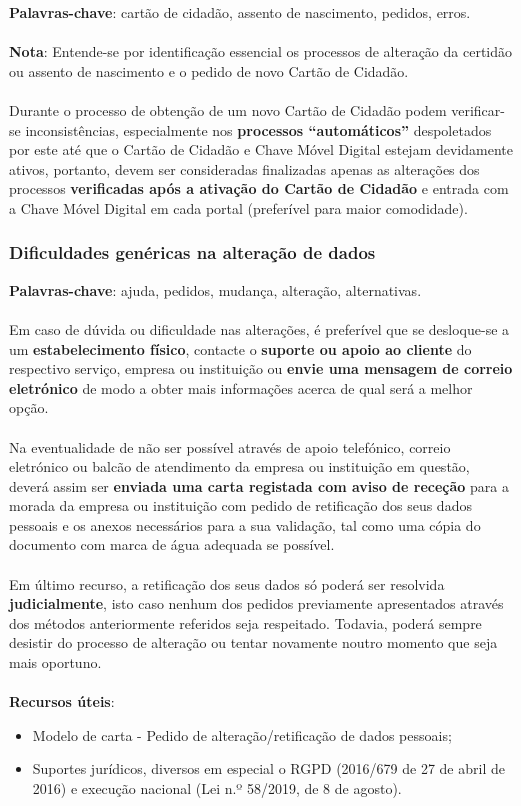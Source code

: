 \textbf{Palavras-chave}: cartão de cidadão, assento de nascimento, pedidos, erros. \\
\\
\textbf{Nota}: Entende-se por identificação essencial os processos de
alteração da certidão ou assento de nascimento e o pedido de novo Cartão
de Cidadão. \\
\\
Durante o processo de obtenção de um novo Cartão de Cidadão podem
verificar-se inconsistências, especialmente nos \textbf{processos
	``automáticos''} despoletados por este até que o Cartão de Cidadão e
Chave Móvel Digital estejam devidamente ativos, portanto, devem ser
consideradas finalizadas apenas as alterações dos processos
\textbf{verificadas após a ativação do Cartão de Cidadão} e entrada com
a Chave Móvel Digital em cada portal (preferível para maior comodidade).

\subsubsection{Dificuldades genéricas na alteração de dados}

\textbf{Palavras-chave}: ajuda, pedidos, mudança, alteração, alternativas. \\
\\
Em caso de dúvida ou dificuldade nas alterações, é preferível que se
desloque-se a um \textbf{estabelecimento físico}, contacte o
\textbf{suporte ou apoio ao cliente} do respectivo serviço, empresa ou
instituição ou \textbf{envie uma mensagem de correio eletrónico} de modo
a obter mais informações acerca de qual será a melhor opção.\\
\\
Na eventualidade de não ser possível através de apoio telefónico,
correio eletrónico ou balcão de atendimento da empresa ou instituição em
questão, deverá assim ser \textbf{enviada uma carta registada com aviso
	de receção} para a morada da empresa ou instituição com pedido de
retificação dos seus dados pessoais e os anexos necessários para a sua
validação, tal como uma cópia do documento com marca de água adequada se
possível.\\
\\
Em último recurso, a retificação dos seus dados só poderá ser resolvida
\textbf{judicialmente}, isto caso nenhum dos pedidos previamente
apresentados através dos métodos anteriormente referidos seja
respeitado. Todavia, poderá sempre desistir do processo de alteração ou
tentar novamente noutro momento que seja mais oportuno. \\
\\
\textbf{Recursos úteis}:
\begin{itemize}
	\item Modelo de carta - Pedido de alteração/retificação de dados pessoais;
	\item Suportes jurídicos, diversos em especial o RGPD (2016/679 de 27 de abril de 2016) e execução nacional (Lei n.º 58/2019, de 8 de agosto).
\end{itemize}

